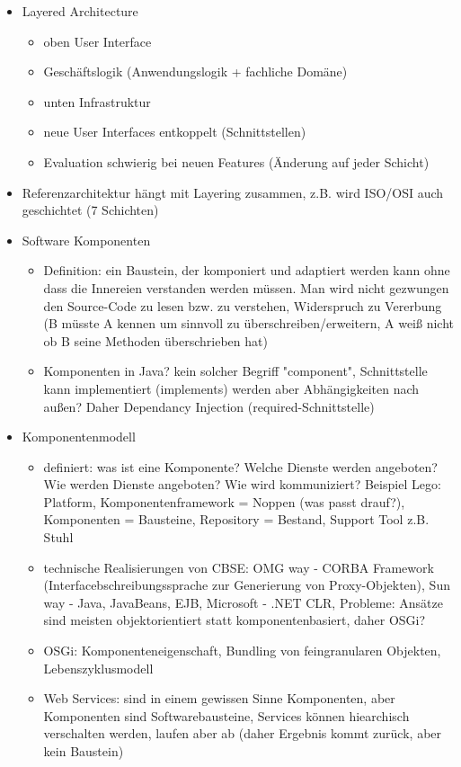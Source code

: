 \documentclass[paper=a4, fontsize=11pt]{scrartcl} %
\numberwithin{equation}{section} %
\numberwithin{figure}{section} %
\numberwithin{table}{section} %
\begin{document}
\begin{itemize}
\begin{itemize}
  \end{itemize}
  \item Layered Architecture
  \begin{itemize}
    \item oben User Interface
    \item Geschäftslogik (Anwendungslogik + fachliche Domäne)
    \item unten Infrastruktur
    \item neue User Interfaces entkoppelt (Schnittstellen)
    \item Evaluation schwierig bei neuen Features (Änderung auf jeder Schicht)
  \end{itemize}
  \item Referenzarchitektur hängt mit Layering zusammen, z.B. wird ISO/OSI auch geschichtet (7 Schichten)
  \item Software Komponenten
  \begin{itemize}
    \item Definition: ein Baustein, der komponiert und adaptiert werden kann ohne dass die Innereien verstanden werden müssen. Man wird nicht gezwungen den Source-Code zu lesen bzw. zu verstehen, Widerspruch zu Vererbung (B müsste A kennen um sinnvoll zu überschreiben/erweitern, A weiß nicht ob B seine Methoden überschrieben hat)
    \item Komponenten in Java? kein solcher Begriff "component", Schnittstelle kann implementiert (implements) werden aber Abhängigkeiten nach außen? Daher Dependancy Injection (required-Schnittstelle)
  \end{itemize}
  \item Komponentenmodell
  \begin{itemize}
    \item definiert: was ist eine Komponente? Welche Dienste werden angeboten? Wie werden Dienste angeboten? Wie wird kommuniziert? Beispiel Lego: Platform, Komponentenframework = Noppen (was passt drauf?), Komponenten = Bausteine, Repository = Bestand, Support Tool z.B. Stuhl
    \item technische Realisierungen von CBSE: OMG way - CORBA Framework (Interfacebschreibungssprache zur Generierung von Proxy-Objekten), Sun way - Java, JavaBeans, EJB, Microsoft - .NET CLR, Probleme: Ansätze sind meisten objektorientiert statt komponentenbasiert, daher OSGi?
    \item OSGi: Komponenteneigenschaft, Bundling von feingranularen Objekten, Lebenszyklusmodell
    \item Web Services: sind in einem gewissen Sinne Komponenten, aber Komponenten sind Softwarebausteine, Services können hiearchisch verschalten werden, laufen aber ab (daher Ergebnis kommt zurück, aber kein Baustein)

\end{itemize}
\end{itemize}
\end{document}
